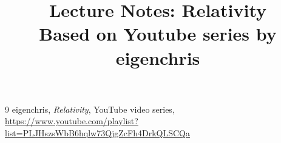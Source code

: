 \documentclass[12pt]{article}
\title{Lecture Notes: Relativity\\
\large Based on Youtube series by eigenchris}
\author{}
\date{}
\begin{document}
\maketitle
\tableofcontents
\newpage






\begin{thebibliography}{9}
eigenchris, \textit{Relativity}, YouTube video series,\\
\url{https://www.youtube.com/playlist?list=PLJHszsWbB6hqlw73QjgZcFh4DrkQLSCQa}
\end{thebibliography}
\end{document}
